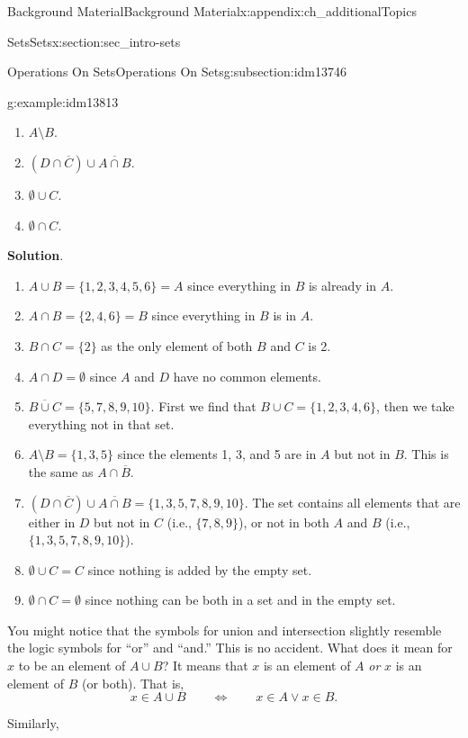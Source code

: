 \documentclass[oneside,10pt,]{book}
\numberwithin{equation}{chapter}
\def\Iff{\Leftrightarrow}
\begin{document}
\begin{appendixptx}{Background Material}{}{Background Material}{}{}{x:appendix:ch_additionalTopics}
\begin{sectionptx}{Sets}{}{Sets}{}{}{x:section:sec_intro-sets}
\begin{subsectionptx}{Operations On Sets}{}{Operations On Sets}{}{}{g:subsection:idm13746}
\begin{example}{}{g:example:idm13813}
\begin{enumerate}
\item{}\(A \setminus B\).%
\item{}\((D \cap \overline C) \cup \overline{A \cap B}\).%
\item{}\(\emptyset \cup C\).%
\item{}\(\emptyset \cap C\).%
\end{enumerate}
%
\par\smallskip%
\noindent\textbf{Solution}.\hypertarget{g:solution:idm13840}{}\quad{}%
\begin{enumerate}
\item{}\(A \cup B = \{1, 2, 3, 4, 5, 6\} = A\) since everything in \(B\) is already in \(A\).%
\item{}\(A \cap B = \{2, 4, 6\} = B\) since everything in \(B\) is in \(A\).%
\item{}\(B \cap C = \{2\}\) as the only element of both \(B\) and \(C\) is 2.%
\item{}\(A \cap D = \emptyset\) since \(A\) and \(D\) have no common elements.%
\item{}\(\overline{B \cup C} = \{5, 7, 8, 9, 10\}\). First we find that \(B \cup C = \{1, 2, 3, 4, 6\}\), then we take everything not in that set.%
\item{}\(A \setminus B = \{1, 3, 5\}\) since the elements 1, 3, and 5 are in \(A\) but not in \(B\). This is the same as \(A \cap \overline B\).%
\item{}\((D \cap \overline C) \cup \overline{A \cap B} = \{1, 3, 5, 7, 8, 9, 10\}.\) The set contains all elements that are either in \(D\) but not in \(C\) (i.e., \(\{7,8,9\}\)), or not in both \(A\) and \(B\) (i.e., \(\{1,3,5,7,8,9,10\}\)).%
\item{}\(\emptyset \cup C = C\) since nothing is added by the empty set.%
\item{}\(\emptyset \cap C = \emptyset\) since nothing can be both in a set and in the empty set.%
\end{enumerate}
%
\end{example}
You might notice that the symbols for union and intersection slightly resemble the logic symbols for ``or'' and ``and.'' This is no accident. What does it mean for \(x\) to be an element of \(A\cup B\)? It means that \(x\) is an element of \(A\) \emph{or} \(x\) is an element of \(B\) (or both). That is,%
\begin{equation*}
x \in A \cup B \qquad \Iff \qquad x \in A \vee x \in B.
\end{equation*}
%
\par
Similarly,%
\begin{equation*}

\end{equation*}
\end{subsectionptx}
\end{sectionptx}
\end{appendixptx}
\end{document}
